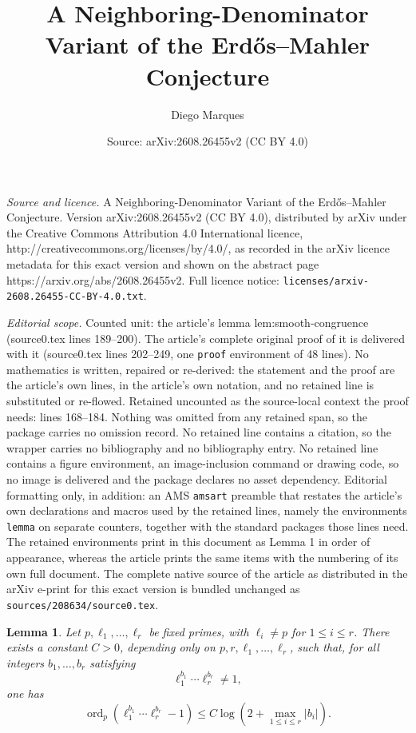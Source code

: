 \documentclass[10pt,a4paper]{amsart}
\title{A Neighboring-Denominator Variant of the Erd\H{o}s--Mahler Conjecture}
\author{Diego Marques}
\date{Source: arXiv:2608.26455v2 (CC BY 4.0)}
\newtheorem{lemma}{Lemma}
\DeclareMathOperator{\ord}{ord}
\begin{document}
\maketitle

\noindent\emph{Source and licence.} A Neighboring-Denominator Variant of the Erd\H{o}s--Mahler Conjecture. Version arXiv:2608.26455v2 (CC BY 4.0), distributed by arXiv under the Creative Commons Attribution 4.0 International licence, http://creativecommons.org/licenses/by/4.0/, as recorded in the arXiv licence metadata for this exact version and shown on the abstract page https://arxiv.org/abs/2608.26455v2. Full licence notice: \texttt{licenses/arxiv-2608.26455-CC-BY-4.0.txt}.\par\smallskip

\noindent\textit{Editorial scope.} Counted unit: the article's lemma lem:smooth-congruence (source0.tex lines 189--200). The article's complete original proof of it is delivered with it (source0.tex lines 202--249, one \texttt{proof} environment of 48 lines). No mathematics is written, repaired or re-derived: the statement and the proof are the article's own lines, in the article's own notation, and no retained line is substituted or re-flowed.  Retained uncounted as the source-local context the proof needs: lines 168--184.  Nothing was omitted from any retained span, so the package carries no omission record.  No retained line contains a citation, so the wrapper carries no bibliography and no bibliography entry.  No retained line contains a figure environment, an image-inclusion command or drawing code, so no image is delivered and the package declares no asset dependency.  Editorial formatting only, in addition: an AMS \texttt{amsart} preamble that restates the article's own declarations and macros used by the retained lines, namely the environments \texttt{lemma} on separate counters, together with the standard packages those lines need.  The retained environments print in this document as Lemma 1 in order of appearance, whereas the article prints the same items with the numbering of its own full document.  The complete native source of the article as distributed in the arXiv e-print for this exact version is bundled unchanged as \texttt{sources/208634/source0.tex}.
\begin{lemma}\label{lem:Yu-special}
Let $p,\ell_1,\ldots,\ell_r$ be fixed primes, with $\ell_i\ne p$
for $1\le i\le r$. There exists a constant $C>0$, depending only on
$p,r,\ell_1,\ldots,\ell_r$, such that, for all integers
$b_1,\ldots,b_r$ satisfying
\[
 \ell_1^{b_1}\cdots\ell_r^{b_r}\ne1,
\]
one has
\begin{equation}\label{eq:Yu-special}
 \ord_p\!\left(
 \ell_1^{b_1}\cdots\ell_r^{b_r}-1
 \right)
 \le
 C\log\left(2+\max_{1\le i\le r}|b_i|\right).
\end{equation}
\end{lemma}
\end{document}
